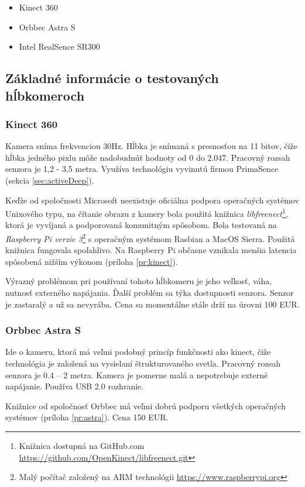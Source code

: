 \begin{itemize}
\item Kinect 360
\item Orbbec Astra S
\item Intel RealSence SR300

\end{itemize}


\subsection{Základné informácie o testovaných hĺbkomeroch}
\subsubsection{Kinect 360}
Kamera sníma frekvenciou 30Hz. Hĺbka je snímaná s presnosťou na 11 bitov, čiže hĺbka jedného pixlu môže nadobudnúť hodnoty od 0 do 2.047.  Pracovný rozsah senzora je  1,2 - 3,5 metra.  Využíva technológiu vyvinutú firmou PrimaSence (sekcia \ref{sec:activeDeep}).

Keďže od spoločnosti Microsoft neexistuje oficiálna podpora operačných systémov Unixového typu, na čítanie obrazu z kamery bola použitá knižnica \textit{libfreenect}\footnote{Knižnica dostupná na GitHub.com \url{https://github.com/OpenKinect/libfreenect.git}}, ktorá je vyvíjaná a podporovaná komunitným spôsobom. Bola testovaná na \textit{Raspberry Pi verzie 3}\footnote{Malý počítač založený na ARM technológii \url{https://www.raspberrypi.org}} s operačným systémom Rasbian a MacOS Sierra. Použitá knižnica fungovala spoľahlivo. Na Raspberry Pi občasne vznikala menšia latencia spôsobená nižším výkonom (príloha \ref{pr:kinect}).

Výrazný problémom pri používaní tohoto hĺbkomeru je jeho veľkosť, váha, nutnosť externého napájania. Ďalší problém sa týka dostupnosti senzora. Senzor je zastaralý a už sa nevyrába. Cena sa momentálne stále drží na úrovni 100 EUR. 

\subsubsection{Orbbec Astra S}
Ide o kameru, ktorá má veľmi podobný princíp funkčnosti ako kinect, čiže technológia je založená na vysielaní štrukturovaného svetla. Pracovný rozsah senzora je 0.4 – 2 metra. Kamera je pomerne malá a nepotrebuje externé napájanie. Používa USB 2.0 rozhranie. 

Knižnice od spoločnosť Orbbec má veľmi dobrú podporu všetkých operačných systémov (príloha \ref{pr:astra}). Cena 150 EUR. 


